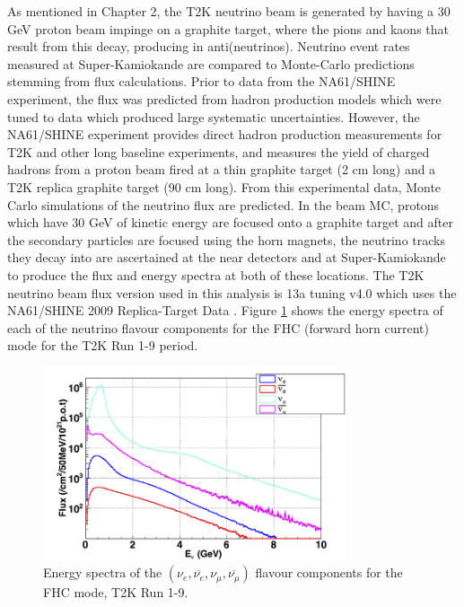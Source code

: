  As mentioned in Chapter 2, the T2K neutrino beam is generated by having a 30 GeV proton beam impinge on a graphite target, where the pions and kaons that result from this decay, producing in anti(neutrinos). Neutrino event rates measured at Super-Kamiokande are compared to Monte-Carlo predictions stemming from flux calculations. Prior to data from the NA61/SHINE experiment, the flux was predicted from hadron production models which were tuned to data which produced large systematic uncertainties. However, the NA61/SHINE experiment provides direct hadron production measurements for T2K and other long baseline experiments, and measures the yield of charged hadrons from a proton beam fired at a thin graphite target (2 cm long) and a T2K replica graphite target (90 cm long). From this experimental data, Monte Carlo simulations of the neutrino flux are predicted. In the beam MC, protons which have 30 GeV of kinetic energy are focused onto a graphite target and after the secondary particles are focused using the horn magnets, the neutrino tracks they decay into are ascertained at the near detectors and at Super-Kamiokande to produce the flux and energy spectra at both of these locations. The T2K neutrino beam flux version used in this analysis is 13a tuning v4.0 which uses the NA61/SHINE 2009 Replica-Target Data \cite{flux_ver}. Figure \ref{fig:energy_spectra} shows the energy spectra of each of the neutrino flavour components for the FHC (forward horn current) mode for the T2K Run 1-9 period. 
 
\begin{figure}
    \includegraphics[width=0.8\textwidth]{Figures/energy_spectra.png}
    \caption{Energy spectra of the  $\left(\nu_{e}, \overline{\nu_{e}}, \nu_{\mu}, \overline{\nu_{\mu}}\right)$ flavour components for the FHC mode, T2K Run 1-9. }
\label{fig:energy_spectra}
\end{figure}
 
